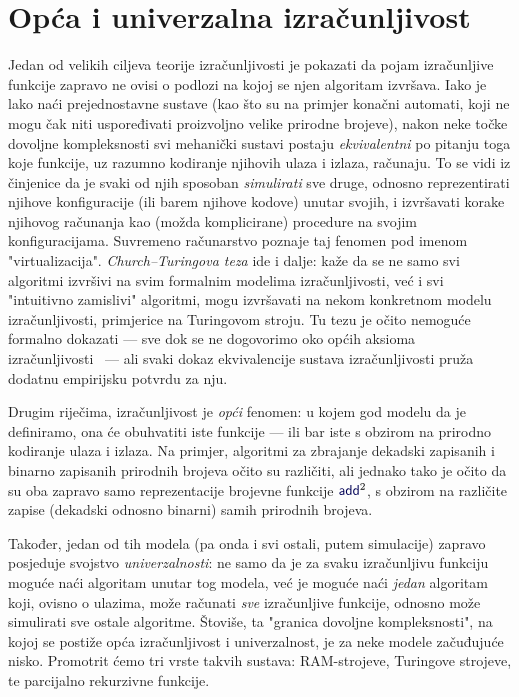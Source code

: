 \section{Opća i univerzalna izračunljivost}

Jedan od velikih ciljeva teorije izračunljivosti je pokazati da pojam izračunljive funkcije zapravo ne ovisi o podlozi na kojoj se njen algoritam izvršava. Iako je lako naći prejednostavne sustave (kao što su na primjer konačni automati, koji ne mogu čak niti uspoređivati proizvoljno velike prirodne brojeve), nakon neke točke dovoljne kompleksnosti svi mehanički sustavi postaju \emph{ekvivalentni} po pitanju toga koje funkcije, uz razumno kodiranje njihovih ulaza i izlaza, računaju. To se vidi iz činjenice da je svaki od njih sposoban \emph{simulirati} sve druge, odnosno reprezentirati njihove konfiguracije (ili barem njihove kodove) unutar svojih, i izvršavati korake njihovog računanja kao (možda komplicirane) procedure na svojim konfiguracijama. Suvremeno računarstvo poznaje taj fenomen pod imenom "virtualizacija". \emph{Church--\!Turingova teza} ide i dalje: kaže da se ne samo svi algoritmi izvršivi na svim formalnim modelima izračunljivosti, već i svi "intuitivno zamislivi" algoritmi, mogu izvršavati na nekom konkretnom modelu izračunljivosti, primjerice na Turingovom stroju. Tu tezu je očito nemoguće formalno dokazati --- sve dok se ne dogovorimo oko općih aksioma izračunljivosti~\cite{dershowitz} --- ali svaki dokaz ekvivalencije sustava izračunljivosti pruža dodatnu empirijsku potvrdu za nju.

Drugim riječima, izračunljivost je \emph{opći} fenomen: u kojem god modelu da je definiramo, ona će obuhvatiti iste funkcije --- ili bar iste s obzirom na prirodno kodiranje ulaza i izlaza. Na primjer, algoritmi za zbrajanje dekadski zapisanih i binarno zapisanih prirodnih brojeva očito su različiti, ali jednako tako je očito da su oba zapravo samo reprezentacije brojevne funkcije $\f{add}^2$, s obzirom na različite zapise (dekadski odnosno binarni) samih prirodnih brojeva.

Također, jedan od tih modela (pa onda i svi ostali, putem simulacije) zapravo posjeduje svojstvo \emph{univerzalnosti}: ne samo da je za svaku izračunljivu funkciju moguće naći algoritam unutar tog modela, već je moguće naći \emph{jedan} algoritam koji, ovisno o ulazima, može računati \emph{sve} izračunljive funkcije, odnosno može simulirati sve ostale algoritme. Štoviše, ta "granica dovoljne kompleksnosti", na kojoj se postiže opća izračunljivost i univerzalnost, je za neke modele začuđujuće nisko. Promotrit ćemo tri vrste takvih sustava: RAM-strojeve, Turingove strojeve, te parcijalno rekurzivne funkcije.

